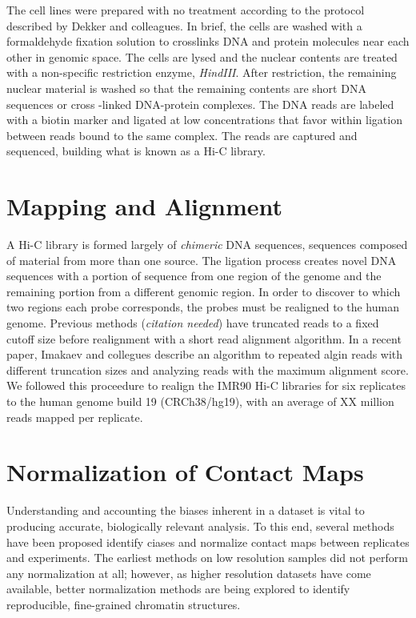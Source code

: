 \documentclass[phd,tocprelim]{cornell}
\begin{document}
The cell lines were prepared with no treatment according to the protocol
described by Dekker and colleagues\cite{dekker2013}.  In brief, the cells
are washed with a formaldehyde fixation solution to crosslinks DNA and
protein molecules near each other in genomic space.  The cells are
lysed and the nuclear contents are treated with a non-specific restriction
enzyme, \textit{HindIII}.  After restriction, the remaining nuclear material
is washed so that the remaining contents are short DNA sequences or cross
-linked DNA-protein complexes.  The DNA reads are labeled with a biotin
marker and ligated at low concentrations that favor within ligation between
reads bound to the same complex.  The reads are captured and sequenced,
building what is known as a Hi-C library.





\section{Mapping and Alignment}

A Hi-C library is formed largely of \textit{chimeric} DNA sequences,
sequences composed of material from more than one source.  The ligation process
creates novel DNA sequences with a portion of sequence from one region of
the genome and the remaining portion from a different genomic region.  In
order to discover to which two regions each probe corresponds, the probes
must be realigned to the human genome.  Previous methods (\textit{citation needed})
have truncated reads to a fixed cutoff size before realignment with a short
read alignment algorithm.  In a recent paper, Imakaev and collegues
describe an algorithm to repeated algin reads with different truncation sizes
and analyzing reads with the maximum alignment score\cite{imakaev2012}.  We followed
this proceedure to realign the IMR90 Hi-C libraries for six replicates to
the human genome build 19 (CRCh38/hg19), with an average of XX million reads
mapped per replicate.

\section{Normalization of Contact Maps}

Understanding and accounting the biases inherent in a dataset is vital to
producing accurate, biologically relevant analysis.  To this end, several methods
have been proposed identify ciases and normalize contact maps between replicates
and experiments\cite{yaffe2011}\cite{hu2012}\cite{yang2014}.  The earliest methods on low
resolution samples did not perform any normalization at all\cite{aiden2009};
however, as higher resolution datasets have come available, better
normalization methods are being explored to identify reproducible,
fine-grained chromatin structures.
\end{document}
